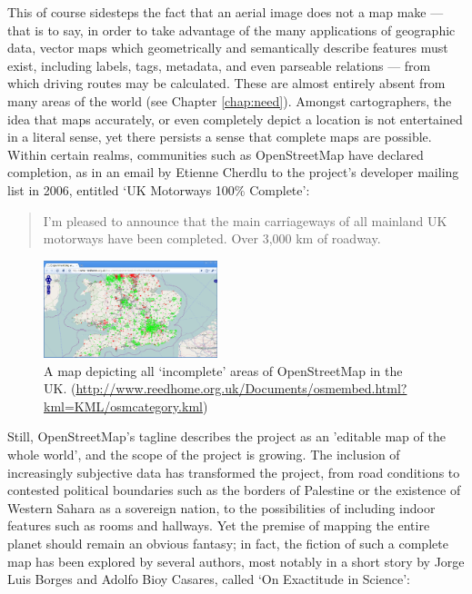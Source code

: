 \documentclass[11pt,oneside,notitlepage]{report}
\begin{document}
This of course sidesteps the fact that an aerial image does not a map make --- that is to say, in order to take advantage of the many applications of geographic data, vector maps which geometrically and semantically describe features must exist, including labels, tags, metadata, and even parseable relations --- from which driving routes may be calculated. These are almost entirely absent from many areas of the world (see Chapter \ref{chap:need}). Amongst cartographers, the idea that maps accurately, or even completely depict a location is not entertained in a literal sense, yet there persists a sense that complete maps are possible. Within certain realms, communities such as OpenStreetMap have declared completion, as in an email by Etienne Cherdlu to the project's developer mailing list in 2006, entitled `UK Motorways 100\% Complete': \begin{quote}I'm pleased to announce that the main carriageways of all mainland UK motorways have been completed. Over 3,000 km of roadway.\end{quote}

\begin{figure}
	\begin{flushright}
		\includegraphics[width=0.45\textwidth]{images/osm-missing-parts.png}
	\caption{A map depicting all `incomplete' areas of OpenStreetMap in the UK. (\url{http://www.reedhome.org.uk/Documents/osmembed.html?kml=KML/osmcategory.kml})}
	\end{flushright}
\end{figure}

Still, OpenStreetMap's tagline describes the project as an 'editable map of the whole world', and the scope of the project is growing. The inclusion of increasingly subjective data has transformed the project, from road conditions to contested political boundaries such as the borders of Palestine or the existence of Western Sahara as a sovereign nation, to the possibilities of including indoor features such as rooms and hallways. Yet the premise of mapping the entire planet should remain an obvious fantasy; in fact, the fiction of such a complete map has been explored by several authors, most notably in a short story by Jorge Luis Borges and Adolfo Bioy Casares, called `On Exactitude in Science':
\end{document}
